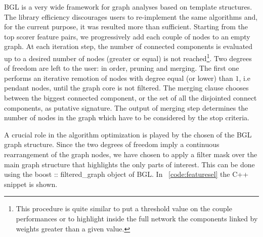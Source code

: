 \documentclass{standalone}
\begin{document}
BGL is a very wide framework for graph analyses based on \textsf{template} structures.
The library efficiency discourages users to re-implement the same algorithms and, for the current purpose, it was resulted more than sufficient.
Starting from the top scorer feature pairs, we progressively add each couple of nodes to an empty graph.
At each iteration step, the number of connected components is evaluated up to a desired number of nodes (greater or equal) is not reached\footnote{
  This procedure is quite similar to put a threshold value on the couple performances or to highlight inside the full network the components linked by weights greater than a given value.
}.
Two degrees of freedom are left to the user: in order, \textsf{pruning} and \textsf{merging}.
The first one performs an iterative remotion of nodes with degree equal (or lower) than $1$, i.e pendant nodes, until the graph core is not filtered.
The \textsf{merging} clause chooses between the biggest connected component, or the set of all the disjointed connect components, as putative signature.
The output of \textsf{merging} step determines the number of nodes in the graph which have to be considered by the stop criteria.

A crucial role in the algorithm optimization is played by the chosen of the BGL graph structure.
Since the two degrees of freedom imply a continuous rearrangement of the graph nodes, we have chosen to apply a filter mask over the main graph structure that highlights the only parts of interest.
This can be done using the \textsf{boost :: filtered\_graph} object of BGL.
In ~\ref{code:featuresel} the \textsf{C++} snippet is shown.
\end{document}
